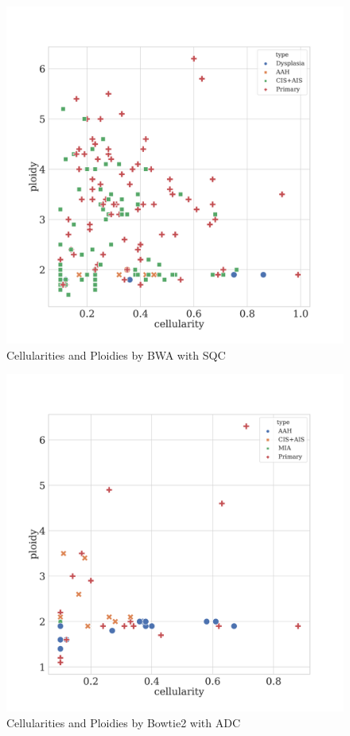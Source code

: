 \documentclass[a4paper]{article}
\begin{document}
            \begin{figure}[htbp]
                \centering
                \includegraphics[width=0.6 \linewidth]{figures/Sequenza/BWA-sequenza-SQC.pdf}
                \caption{Cellularities and Ploidies by BWA with SQC}
                \label{fig:sequenza-BWA-SQC}
            \end{figure}

            \begin{figure}[htbp]
                \centering
                \includegraphics[width=0.6 \linewidth]{figures/Sequenza/Bowtie2-sequenza-ADC.pdf}
                \caption{Cellularities and Ploidies by Bowtie2 with ADC}
                \label{fig:sequenza-Bowtie2-ADC}
            \end{figure}
\end{document}
